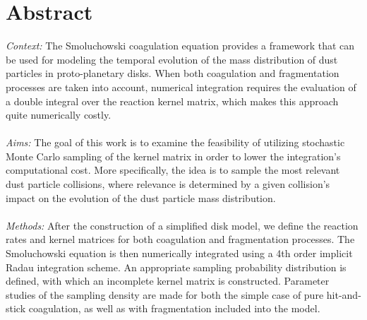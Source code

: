 \cleardoublepage\chapter*{Abstract}
\thispagestyle{NoHeader}

\textit{Context:}
The Smoluchowski coagulation equation provides a framework that can be used for modeling the 
temporal evolution of the mass distribution of dust particles in proto-planetary disks.
When both coagulation and fragmentation processes are taken into account,
numerical integration requires the evaluation of a double integral over the 
reaction kernel matrix, which makes this approach quite numerically costly.
\\ \ \\
\textit{Aims:}
The goal of this work is to examine the feasibility of utilizing stochastic Monte Carlo sampling 
of the kernel matrix in order to lower the integration's computational cost.
More specifically, the idea is to sample the most relevant dust particle collisions,
where relevance is determined by a given collision's impact on the evolution of the 
dust particle mass distribution.
\\ \ \\
\textit{Methods:}
After the construction of a simplified disk model, we define the reaction rates and kernel matrices
for both coagulation and fragmentation processes. The Smoluchowski equation is then numerically 
integrated using a 4th order implicit Radau integration scheme.
An appropriate sampling probability distribution is defined, 
with which an incomplete kernel matrix is constructed.
Parameter studies of the sampling density 
are made for both the simple case of pure hit-and-stick coagulation, as well as with 
fragmentation included into the model.
